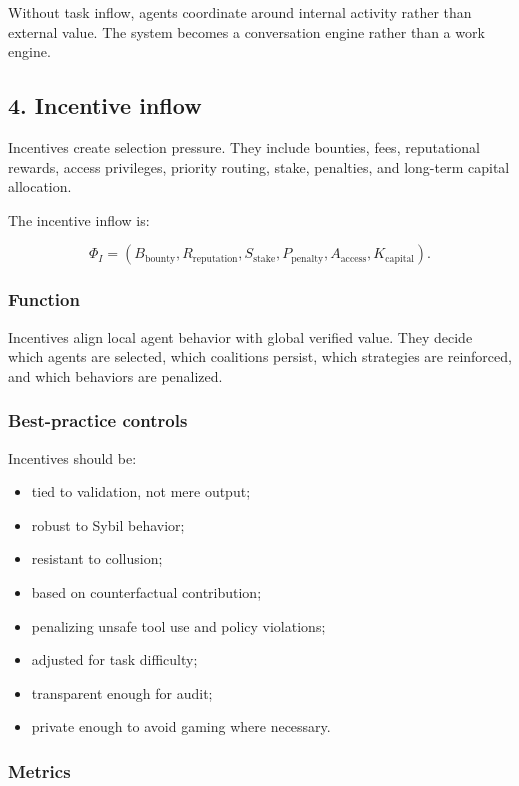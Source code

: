 \documentclass[
  11pt,
]{article}
\providecommand{\tightlist}{%
  \setlength{\itemsep}{0pt}\setlength{\parskip}{0pt}}
\begin{document}
Without task inflow, agents coordinate around internal activity rather
than external value. The system becomes a conversation engine rather
than a work engine.

\subsection{4. Incentive inflow}\label{incentive-inflow}

Incentives create selection pressure. They include bounties, fees,
reputational rewards, access privileges, priority routing, stake,
penalties, and long-term capital allocation.

The incentive inflow is:

\[
\Phi_I=(B_{\text{bounty}},R_{\text{reputation}},S_{\text{stake}},P_{\text{penalty}},A_{\text{access}},K_{\text{capital}}).
\]

\subsubsection{Function}\label{function-3}

Incentives align local agent behavior with global verified value. They
decide which agents are selected, which coalitions persist, which
strategies are reinforced, and which behaviors are penalized.

\subsubsection{Best-practice controls}\label{best-practice-controls-3}

Incentives should be:

\begin{itemize}
\tightlist
\item
  tied to validation, not mere output;
\item
  robust to Sybil behavior;
\item
  resistant to collusion;
\item
  based on counterfactual contribution;
\item
  penalizing unsafe tool use and policy violations;
\item
  adjusted for task difficulty;
\item
  transparent enough for audit;
\item
  private enough to avoid gaming where necessary.
\end{itemize}

\subsubsection{Metrics}\label{metrics-3}
\end{document}
